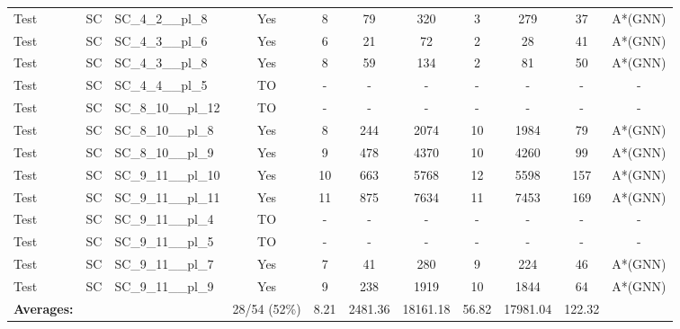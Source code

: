 \documentclass{article}
\begin{document}
\begin{tabular}{lllcccccccc}
Test & SC & SC\_4\_2\_\_pl\_8 & Yes & 8 & 79 & 320 & 3 & 279 & 37 & A*(GNN) \\
Test & SC & SC\_4\_3\_\_pl\_6 & Yes & 6 & 21 & 72 & 2 & 28 & 41 & A*(GNN) \\
Test & SC & SC\_4\_3\_\_pl\_8 & Yes & 8 & 59 & 134 & 2 & 81 & 50 & A*(GNN) \\
Test & SC & SC\_4\_4\_\_pl\_5 & TO & - & - & - & - & - & - & - \\
Test & SC & SC\_8\_10\_\_pl\_12 & TO & - & - & - & - & - & - & - \\
Test & SC & SC\_8\_10\_\_pl\_8 & Yes & 8 & 244 & 2074 & 10 & 1984 & 79 & A*(GNN) \\
Test & SC & SC\_8\_10\_\_pl\_9 & Yes & 9 & 478 & 4370 & 10 & 4260 & 99 & A*(GNN) \\
Test & SC & SC\_9\_11\_\_pl\_10 & Yes & 10 & 663 & 5768 & 12 & 5598 & 157 & A*(GNN) \\
Test & SC & SC\_9\_11\_\_pl\_11 & Yes & 11 & 875 & 7634 & 11 & 7453 & 169 & A*(GNN) \\
Test & SC & SC\_9\_11\_\_pl\_4 & TO & - & - & - & - & - & - & - \\
Test & SC & SC\_9\_11\_\_pl\_5 & TO & - & - & - & - & - & - & - \\
Test & SC & SC\_9\_11\_\_pl\_7 & Yes & 7 & 41 & 280 & 9 & 224 & 46 & A*(GNN) \\
Test & SC & SC\_9\_11\_\_pl\_9 & Yes & 9 & 238 & 1919 & 10 & 1844 & 64 & A*(GNN) \\
\textbf{Averages:} & & & 28/54 (52\%) & 8.21 & 2481.36 & 18161.18 & 56.82 & 17981.04 & 122.32 & \\
\bottomrule
\end{tabular}
\newpage
\end{document}
